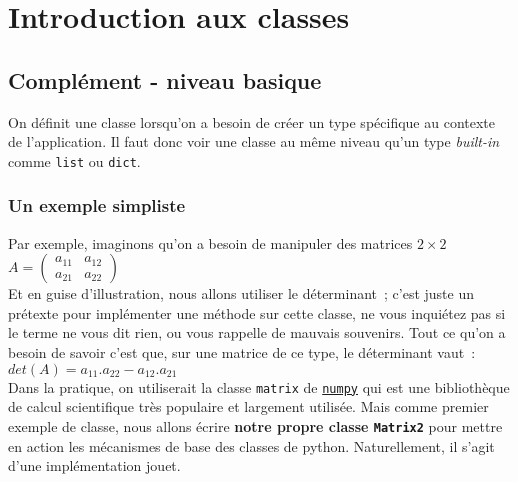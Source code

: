     \hypertarget{introduction-aux-classes}{%
\section{Introduction aux classes}\label{introduction-aux-classes}}

    \hypertarget{compluxe9ment---niveau-basique}{%
\subsection{Complément - niveau
basique}\label{compluxe9ment---niveau-basique}}

    On définit une classe lorsqu'on a besoin de créer un type spécifique au
contexte de l'application. Il faut donc voir une classe au même niveau
qu'un type \emph{built-in} comme \texttt{list} ou \texttt{dict}.

    \hypertarget{un-exemple-simpliste}{%
\subsubsection{Un exemple simpliste}\label{un-exemple-simpliste}}

    Par exemple, imaginons qu'on a besoin de manipuler des matrices
\(2\times 2\)\\

\(A = \left( \begin{array}{cc} a_{11} & a_{12} \\ a_{21} & a_{22}\end{array} \right)\)\\

Et en guise d'illustration, nous allons utiliser le déterminant~; c'est
juste un prétexte pour implémenter une méthode sur cette classe, ne vous
inquiétez pas si le terme ne vous dit rien, ou vous rappelle de mauvais
souvenirs. Tout ce qu'on a besoin de savoir c'est que, sur une matrice
de ce type, le déterminant vaut~:\\

\(det (A) = a_{11}.a_{22} - a_{12}.a_{21}\)\\

    Dans la pratique, on utiliserait la classe \texttt{matrix} de
\href{http://www.numpy.org/}{\texttt{numpy}} qui est une bibliothèque de
calcul scientifique très populaire et largement utilisée. Mais comme
premier exemple de classe, nous allons écrire \textbf{notre propre
classe \texttt{Matrix2}} pour mettre en action les mécanismes de base
des classes de python. Naturellement, il s'agit d'une implémentation
jouet.

